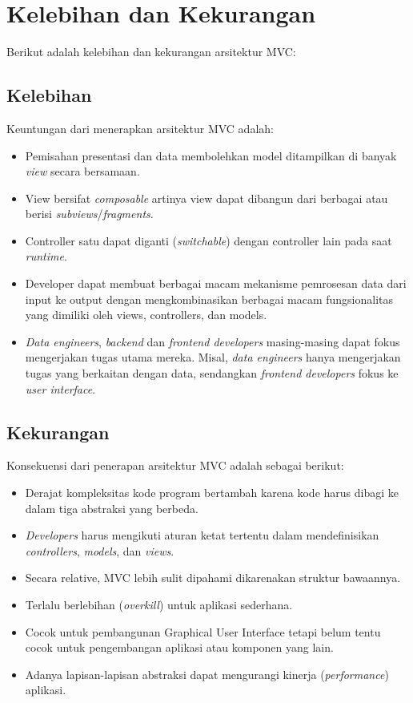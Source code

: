 \section{Kelebihan dan Kekurangan}
Berikut adalah kelebihan dan kekurangan arsitektur MVC:


\subsection{Kelebihan}
Keuntungan dari menerapkan arsitektur MVC adalah:
\begin{itemize}
\item Pemisahan presentasi dan data membolehkan model ditampilkan di banyak \textit{view} secara bersamaan.
\item View bersifat \textit{composable} artinya view dapat dibangun dari berbagai atau berisi \textit{subviews}/\textit{fragments}.
\item Controller satu dapat diganti (\textit{switchable}) dengan controller lain pada saat \textit{runtime}.
\item Developer dapat membuat berbagai macam mekanisme pemrosesan data dari input ke output dengan mengkombinasikan berbagai macam fungsionalitas yang dimiliki oleh views, controllers, dan models.
\item \textit{Data engineers}, \textit{backend} dan \textit{frontend developers} masing-masing dapat fokus mengerjakan tugas utama mereka. 
Misal, \textit{data engineers} hanya mengerjakan tugas yang berkaitan dengan data, sendangkan \textit{frontend developers} fokus ke \textit{user interface}.
\end{itemize}

\subsection{Kekurangan}
Konsekuensi dari penerapan arsitektur MVC adalah sebagai berikut:
\begin{itemize}
\item Derajat kompleksitas kode program bertambah karena kode harus dibagi ke dalam tiga abstraksi yang berbeda.
\item \textit{Developers} harus mengikuti aturan ketat tertentu dalam mendefinisikan \textit{controllers}, \textit{models}, dan \textit{views}. 
\item Secara relative, MVC lebih sulit dipahami dikarenakan struktur bawaannya.
\item Terlalu berlebihan (\textit{overkill}) untuk aplikasi sederhana.
\item Cocok untuk pembangunan Graphical User Interface tetapi belum tentu cocok untuk pengembangan aplikasi atau komponen yang lain. 
\item Adanya lapisan-lapisan abstraksi dapat mengurangi kinerja (\textit{performance}) aplikasi.
\end{itemize}

